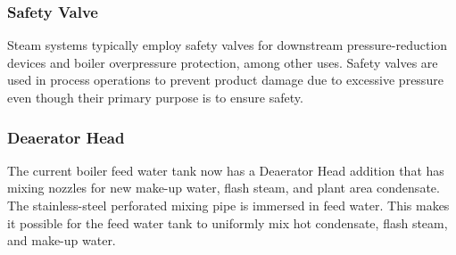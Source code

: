 \subsubsection{Safety Valve}
Steam systems typically employ safety valves for downstream pressure-reduction devices and boiler overpressure protection, among other uses. Safety valves are used in process operations to prevent product damage due to excessive pressure even though their primary purpose is to ensure safety.

\subsubsection{Deaerator Head}
The current boiler feed water tank now has a Deaerator Head addition that has mixing nozzles for new make-up water, flash steam, and plant area condensate. The stainless-steel perforated mixing pipe is immersed in feed water. This makes it possible for the feed water tank to uniformly mix hot condensate, flash steam, and make-up water.


